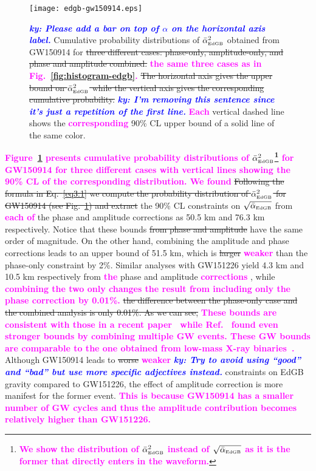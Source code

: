\documentclass[prd,twocolumn,nofootinbib]{revtex4-1}
\newcommand{\EDGB}{{\mbox{\tiny EdGB}}}
\newcommand{\ky}[1]{\textcolor{blue}{\it{\textbf{ky: #1}}} }
\newcommand{\kent}[1]{\textcolor{magenta}{\textbf{#1}} }
\begin{document}
\begin{figure}[htb]
\texttt{[image: edgb-gw150914.eps]}
\caption{\ky{Please add a bar on top of $\alpha$ on the horizontal axis label.}
Cumulative probability distributions of $\bar{\alpha}^2_{\EDGB}$ obtained from GW150914 for \sout{three different cases: phase-only, amplitude-only, and phase and amplitude combined. } \kent{the same three cases as in Fig.~\ref{fig:histogram-edgb}.} \sout{The horizontal axis gives the upper bound on $\bar{\alpha}^2_{\EDGB}$ while the vertical axis gives the corresponding cumulative probability.} \ky{I'm removing this sentence since it's just a repetition of the first line.} \kent{Each} vertical dashed line shows the \kent{corresponding} 90\% CL upper bound of a solid line of the same color.}
\label{fig:pdf-edgb}
\end{figure}


\kent{Figure~\ref{fig:pdf-edgb} presents cumulative probability distributions of $\bar{\alpha}^2_{\EDGB}$\footnote{\kent{We show the distribution of $\bar{\alpha}^2_{\EDGB}$ instead of $\sqrt{\bar{\alpha}_{\EDGB}}$ as it is the former that directly enters in the waveform.}} for GW150914 for three different cases with vertical lines showing the 90\% CL of the corresponding distribution. We found}
\sout{Following the formula in Eq.~\eqref{eq3:1} we compute the probability distribution of $\bar{\alpha}^2_{\EDGB}$ for GW150914 (see Fig.~\ref{fig:pdf-edgb}) and extract} the 90\% CL constraints on  $\sqrt{\bar{\alpha}_{\EDGB}}$ from \kent{each of} the phase and amplitude corrections as 50.5 km and 76.3 km respectively. Notice that these bounds \sout{from phase and amplitude} have the same order of magnitude. On the other hand, combining the amplitude and phase corrections leads to an upper bound of 51.5 km, which is \sout{larger} \kent{weaker} than the  phase-only constraint by 2\%.
Similar analyses with GW151226 yield 4.3 km and 10.5 km respectively from \kent{the} phase and amplitude \kent{corrections},
while \kent{combining the two only changes the result from including only the phase correction by 0.01\%.} \sout{the difference between the phase-only case and the combined analysis  is only 0.01\%. As we can see,} 
\kent{These bounds are consistent with those in a recent paper~\cite{Nair:2019iur} while Ref.~\cite{Yamada:2019zrb} found even stronger bounds by combining multiple GW events. These GW bounds are comparable to the one obtained from low-mass X-ray binaries~\cite{Yagi:2012gp}.}
Although GW150914 leads to \sout{worse} \kent{weaker} \ky{Try to avoid using ``good'' and ``bad'' but use more specific adjectives instead.} constraints on EdGB gravity compared to GW151226, the effect of amplitude correction is more manifest for the former event. \kent{This is because GW150914 has a smaller number of GW cycles and thus the amplitude contribution becomes relatively higher than GW151226.}
\end{document}
